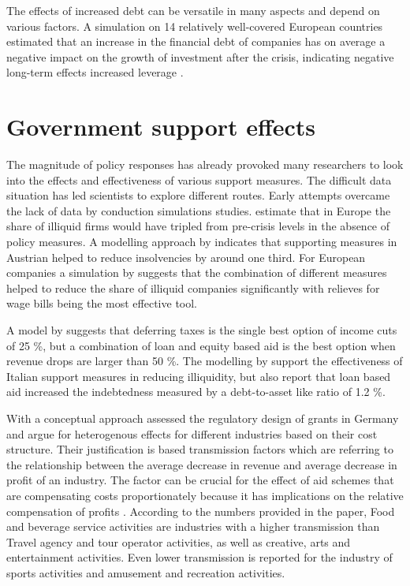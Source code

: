 The effects of increased debt can be versatile in many aspects and depend on various factors. A simulation on 14 relatively well-covered European countries estimated that an increase in the financial debt of companies has on average a negative impact on the growth of investment after the crisis, indicating negative long-term effects increased leverage \parencite{demmou_insolvency_2021}.




\section{Government support effects}

The magnitude of policy responses has already provoked many researchers to look into the effects and effectiveness of various support measures. The difficult data situation has led scientists to explore different routes. 
Early attempts overcame the lack of data by conduction simulations studies. \parencite{ebeke_corporate_2021} estimate that in Europe the share of illiquid firms would have tripled from pre-crisis levels in the absence of policy measures.
A modelling approach by \parencite{puhr_have_2021} indicates that supporting measures in Austrian helped to reduce insolvencies by around one third. 
For European companies a simulation by \parencite{demmou_liquidity_2021} suggests that the combination of different measures helped to reduce the share of illiquid companies significantly with relieves for wage bills being the most effective tool.

A model by \parencite{chang_studying_2022} suggests that deferring taxes is the single best option of income cuts of 25 \%, but a combination of loan and equity based aid is the best option when revenue drops are larger than 50 \%.
The modelling by \parencite{parlapiano_effects_2020} support the effectiveness of Italian support measures in reducing illiquidity, but also report that loan based aid increased the indebtedness measured by a debt-to-asset like ratio of 1.2 \%.

With a conceptual approach \parencite{bischof_bedeutung_2021} assessed the regulatory design of grants in Germany and argue for heterogenous effects for different industries based on their cost structure. Their justification is based transmission factors which are referring to the relationship between the average decrease in revenue and average decrease in profit of an industry. The factor can be crucial for the effect of aid schemes that are compensating costs proportionately because it has implications on the relative compensation of profits \parencite{bischof_bedeutung_2021}. According to the numbers provided in the paper, Food and beverage service activities are industries with a higher transmission than Travel agency and tour operator activities, as well as creative, arts and entertainment activities. Even lower transmission is reported for the industry of sports activities and amusement and recreation activities.



